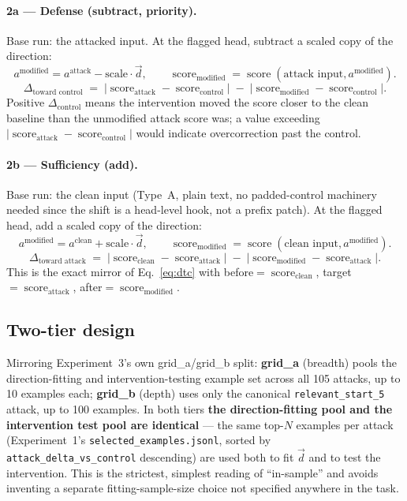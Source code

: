 \documentclass[11pt]{article}
\newcommand{\score}{\operatorname{score}}
\newcommand{\dirvec}{\ensuremath{\vec{d}}}
\newcommand{\dtc}{\ensuremath{\Delta_{\text{control}}}}
\begin{document}
\paragraph{2a --- Defense (subtract, priority).} Base run: the attacked
input. At the flagged head, subtract a scaled copy of the direction:
\begin{equation}
a^{\text{modified}} = a^{\text{attack}} - \text{scale}\cdot\dirvec, \qquad
\score_{\text{modified}} = \score(\text{attack input}, a^{\text{modified}}).
\end{equation}
\begin{equation}
\Delta_{\text{toward control}} \;=\;
\big|\score_{\text{attack}} - \score_{\text{control}}\big|
\;-\;
\big|\score_{\text{modified}} - \score_{\text{control}}\big|.
\label{eq:dtc}
\end{equation}
Positive $\dtc$ means the intervention moved the score closer to the clean
baseline than the unmodified attack score was; a value exceeding
$|\score_{\text{attack}}-\score_{\text{control}}|$ would indicate
overcorrection past the control.

\paragraph{2b --- Sufficiency (add).} Base run: the clean input (Type~A,
plain text, no padded-control machinery needed since the shift is a
head-level hook, not a prefix patch). At the flagged head, add a scaled
copy of the direction:
\begin{equation}
a^{\text{modified}} = a^{\text{clean}} + \text{scale}\cdot\dirvec, \qquad
\score_{\text{modified}} = \score(\text{clean input}, a^{\text{modified}}).
\end{equation}
\begin{equation}
\Delta_{\text{toward attack}} \;=\;
\big|\score_{\text{clean}} - \score_{\text{attack}}\big|
\;-\;
\big|\score_{\text{modified}} - \score_{\text{attack}}\big|.
\label{eq:dta}
\end{equation}
This is the exact mirror of Eq.~\eqref{eq:dtc} with before$=\score_{\text{clean}}$,
target$=\score_{\text{attack}}$, after$=\score_{\text{modified}}$.

\subsection{Two-tier design}

Mirroring Experiment~3's own grid\_a/grid\_b split: \textbf{grid\_a}
(breadth) pools the direction-fitting and intervention-testing example set
across all 105 attacks, up to 10 examples each; \textbf{grid\_b} (depth)
uses only the canonical \texttt{relevant\_start\_5} attack, up to 100
examples. In both tiers \textbf{the direction-fitting pool and the
intervention test pool are identical} --- the same top-$N$ examples per
attack (Experiment~1's \texttt{selected\_examples.jsonl}, sorted by
\texttt{attack\_delta\_vs\_control} descending) are used both to fit
$\dirvec$ and to test the intervention. This is the strictest, simplest
reading of ``in-sample'' and avoids inventing a separate fitting-sample-size
choice not specified anywhere in the task.
\end{document}
